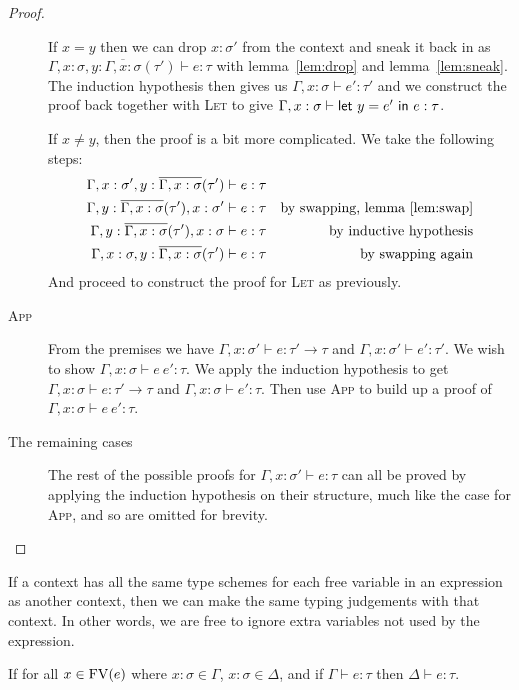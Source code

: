 \begin{proof}
\begin{description}
    If $x = y$ then we can drop $x :
    \sigma'$ from the context and sneak it back in as $\Gamma , x : \sigma, y :
    \overline{\Gamma, x : \sigma}(\tau') \vdash e : \tau$ with lemma~\ref{lem:drop} and
    lemma~\ref{lem:sneak}. The induction hypothesis then gives us $\Gamma ,
    x : \sigma \vdash e' : \tau'$ and we construct the proof back together with
    \textsc{Let} to give $\Gamma , x : \sigma \vdash \mathsf{let} \ y = e' \ \mathsf{in} \ e : \tau$.

    If $x \neq y$, then the proof is a bit more complicated. We take the
    following steps:
    \begin{align*}
      \Gamma , x : \sigma' , y : \overline{\Gamma, x : \sigma}(\tau') \vdash e : \tau \\
      \Gamma , y : \overline{\Gamma, x : \sigma}(\tau') , x : \sigma' \vdash e : \tau &&  \text{by
                                                            swapping,
                                                            lemma~\ref{lem:swap}}
      \\
      \Gamma , y : \overline{\Gamma, x : \sigma}(\tau') , x : \sigma \vdash e : \tau && \text{by
                                                           inductive
                                                           hypothesis} \\
      \Gamma , x : \sigma , y : \overline{\Gamma, x : \sigma}(\tau') \vdash e : \tau && \text{by swapping again}
    \end{align*}
    And proceed to construct the proof for \textsc{Let} as previously.
  \item[\rm\textsc{App}]
    From the premises we have $\Gamma , x : \sigma' \vdash e : \tau' \rightarrow \tau$ and $\Gamma , x : \sigma' \vdash
    e' : \tau'$. We wish to show $\Gamma , x : \sigma \vdash e \ e' : \tau$.
    We apply the induction hypothesis to get $\Gamma , x : \sigma \vdash e : \tau' \rightarrow \tau$
    and  $\Gamma , x : \sigma \vdash e' : \tau$. Then use \textsc{App} to build up a
    proof of $\Gamma , x : \sigma \vdash e \ e' : \tau$.
  \item[The remaining cases] The rest of the possible proofs for
    $\Gamma , x : \sigma' \vdash e : \tau$ can all be proved by applying the
    induction hypothesis on their structure, much like the case for
    \textsc{App}, and so are omitted for brevity.
  \end{description}
\end{proof}

If a context has all the same type schemes for each free variable in
an expression as another context, then we can make the same typing
judgements with that context. In other words, we are free to ignore
extra variables not used by the expression.
\begin{lemma} \label{lem:ignore}
  If for all $x \in \operatorname{FV}(e)$ where $x : \sigma \in \Gamma$, $x : \sigma \in \Delta$, and if $\Gamma \vdash
  e : \tau$ then $\Delta \vdash e : \tau$.
\end{lemma}

